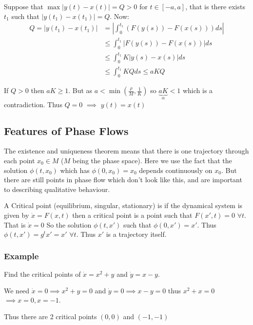 Suppose that $\max |y(t) - x(t)| = Q > 0$ for $t\in [-a,a]$, that is there exists $t_1$ such that $|y(t_1) - x(t_1)| = Q$. Now:
\begin{align*}
Q = |y(t_1) - x(t_1)| &= | \int_0^{t_1} (F(y(s)) - F(x(s))) ds | \\
&\leq \int_0^{t_1} | F(y(s)) - F(x(s))| ds \\
&\leq \int_0^{t_1} K|y(s) - x(s)| ds \\
&\leq \int_0^{t_1} KQ ds \leq aKQ
\end{align*}

If $Q>0$ then $aK\geq1$. But as $a < \min \left(\frac{\rho}{M}, \frac{1}{K}\right)$ so $\underbrace{aK}_{\alpha} < 1$ which is a contradiction. Thus $Q=0$ $\implies$ $y(t) = x(t)$

\subsection{Features of Phase Flows}

The existence and uniqueness theorem means that there is one trajectory through each point $x_0 \in M$ ($M$ being the phase space). Here we use the fact that the solution $\phi(t, x_0)$ which has $\phi(0, x_0) = x_0$ depends continuously on $x_0$. But there are still points in phase flow which don't look like this, and are important to describing qualitative behaviour.

A Critical point (equilibrium, singular, stationary) is if the dynamical system is given by $\dot{x} = F(x,t)$ then a critical point is a point such that $F(x',t) = 0$ $\forall t$. That is $\dot{x} = 0$ So the solution $\phi(t, x')$ such that $\phi(0,x') = x'$. Thus $\phi(t,x') = g^t x' = x'$ $\forall t$. Thus $x'$ is a trajectory itself.  

\subsubsection*{Example}

Find the critical points of $\dot{x} = x^2 + y$ and $\dot{y} = x-y$.

We need $\dot{x} = 0 \implies x^2 + y = 0$ and $\dot{y} = 0 \implies x-y = 0$ thus $x^2+x=0$ $\implies x=0, x=-1$.

Thus there are 2 critical points $(0,0)$ and $(-1, -1)$
